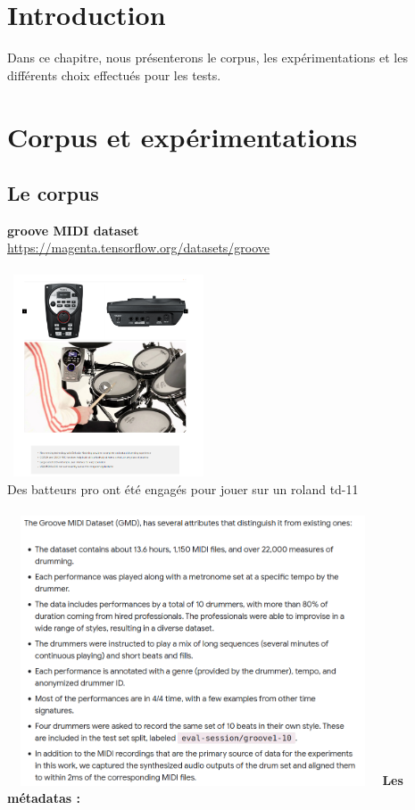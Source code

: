 \section{Introduction}
Dans ce chapitre, nous présenterons le corpus, les expérimentations et les différents choix effectués pour les tests.
\section{Corpus et expérimentations}
\subsection*{Le corpus}
\textbf{groove MIDI dataset}\\
\url{https://magenta.tensorflow.org/datasets/groove}\\\\
\includegraphics[height=60mm, width=60mm]{z_images/3_groove/roland_TD11.png}\\
Des batteurs pro ont été engagés pour jouer sur un roland td-11\\\\
\includegraphics[height=80mm, width=110mm]{z_images/3_groove/dataset_how.png}\newpage{}
\textbf{Les métadatas :}\\\\
